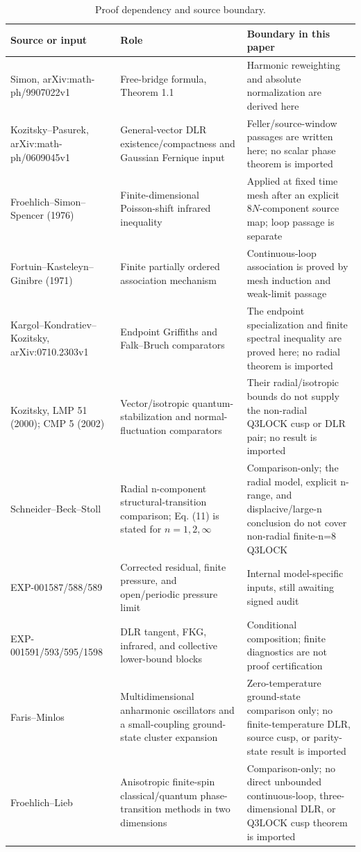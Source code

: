 \documentclass[11pt]{article}
\numberwithin{equation}{section}
\theoremstyle{definition}
\begin{document}
\begin{table}[ht]
\centering
\small
\begin{tabular}{p{}p{}p{}}
\toprule
Source or input & Role & Boundary in this paper\\
\midrule
Simon, arXiv:math-ph/9907022v1 & Free-bridge formula, Theorem 1.1 & Harmonic reweighting and absolute normalization are derived here\\
Kozitsky--Pasurek, arXiv:math-ph/0609045v1 & General-vector DLR existence/compactness and Gaussian Fernique input & Feller/source-window passages are written here; no scalar phase theorem is imported\\
Froehlich--Simon--Spencer (1976) & Finite-dimensional Poisson-shift infrared inequality & Applied at fixed time mesh after an explicit $8N$-component source map; loop passage is separate\\
Fortuin--Kasteleyn--Ginibre (1971) & Finite partially ordered association mechanism & Continuous-loop association is proved by mesh induction and weak-limit passage\\
Kargol--Kondratiev--Kozitsky, arXiv:0710.2303v1 & Endpoint Griffiths and Falk--Bruch comparators & The endpoint specialization and finite spectral inequality are proved here; no radial theorem is imported\\
Kozitsky, LMP 51 (2000); CMP 5 (2002)~\cite{Koz-vector,Koz-CMP} & Vector/isotropic quantum-stabilization and normal-fluctuation comparators & Their radial/isotropic bounds do not supply the non-radial Q3LOCK cusp or DLR pair; no result is imported\\
Schneider--Beck--Stoll~\cite{Schneider-Beck-Stoll} & Radial n-component structural-transition comparison; Eq. (11) is stated for $n=1,2,\infty$ & Comparison-only; the radial model, explicit n-range, and displacive/large-n conclusion do not cover non-radial finite-n=8 Q3LOCK\\
EXP-001587/588/589 & Corrected residual, finite pressure, and open/periodic pressure limit & Internal model-specific inputs, still awaiting signed audit\\
EXP-001591/593/595/1598 & DLR tangent, FKG, infrared, and collective lower-bound blocks & Conditional composition; finite diagnostics are not proof certification\\
Faris--Minlos~\cite{Faris-Minlos} & Multidimensional anharmonic oscillators and a small-coupling ground-state cluster expansion & Zero-temperature ground-state comparison only; no finite-temperature DLR, source cusp, or parity-state result is imported\\
Froehlich--Lieb~\cite{Frohlich-Lieb} & Anisotropic finite-spin classical/quantum phase-transition methods in two dimensions & Comparison-only; no direct unbounded continuous-loop, three-dimensional DLR, or Q3LOCK cusp theorem is imported\\
\bottomrule
\end{tabular}
\caption{Proof dependency and source boundary.}
\label{tab:crosswalk}
\end{table}
\end{document}
